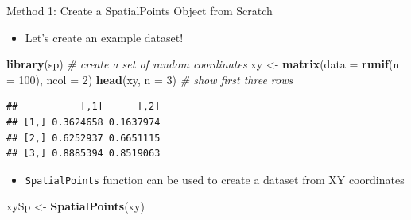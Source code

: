 \documentclass[10pt,ignorenonframetext,]{beamer}
\newenvironment{Shaded}{\begin{snugshade}}{\end{snugshade}}
\newcommand{\KeywordTok}[1]{\textcolor[rgb]{0.13,0.29,0.53}{\textbf{{#1}}}}
\newcommand{\DataTypeTok}[1]{\textcolor[rgb]{0.13,0.29,0.53}{{#1}}}
\newcommand{\DecValTok}[1]{\textcolor[rgb]{0.00,0.00,0.81}{{#1}}}
\newcommand{\StringTok}[1]{\textcolor[rgb]{0.31,0.60,0.02}{{#1}}}
\newcommand{\CommentTok}[1]{\textcolor[rgb]{0.56,0.35,0.01}{\textit{{#1}}}}
\newcommand{\NormalTok}[1]{{#1}}
\providecommand{\tightlist}{%
  \setlength{\itemsep}{0pt}\setlength{\parskip}{0pt}}
\begin{document}
\begin{frame}[fragile]{Method 1: Create a SpatialPoints Object from
Scratch}

\begin{itemize}
\tightlist
\item
  Let's create an example dataset!
\end{itemize}

\begin{Shaded}
\begin{Highlighting}[]
\KeywordTok{library}\NormalTok{(sp)}
\CommentTok{# create a set of random coordinates}
\NormalTok{xy <-}\StringTok{ }\KeywordTok{matrix}\NormalTok{(}\DataTypeTok{data =} \KeywordTok{runif}\NormalTok{(}\DataTypeTok{n =} \DecValTok{100}\NormalTok{), }\DataTypeTok{ncol =} \DecValTok{2}\NormalTok{)}
\KeywordTok{head}\NormalTok{(xy, }\DataTypeTok{n =} \DecValTok{3}\NormalTok{)  }\CommentTok{# show first three rows}
\end{Highlighting}
\end{Shaded}

\begin{verbatim}
##           [,1]      [,2]
## [1,] 0.3624658 0.1637974
## [2,] 0.6252937 0.6651115
## [3,] 0.8885394 0.8519063
\end{verbatim}

\begin{itemize}
\tightlist
\item
  \texttt{SpatialPoints} function can be used to create a dataset from
  XY coordinates
\end{itemize}

\begin{Shaded}
\begin{Highlighting}[]
\NormalTok{xySp <-}\StringTok{ }\KeywordTok{SpatialPoints}\NormalTok{(xy)}
\end{Highlighting}
\end{Shaded}

\end{frame}
\end{document}
